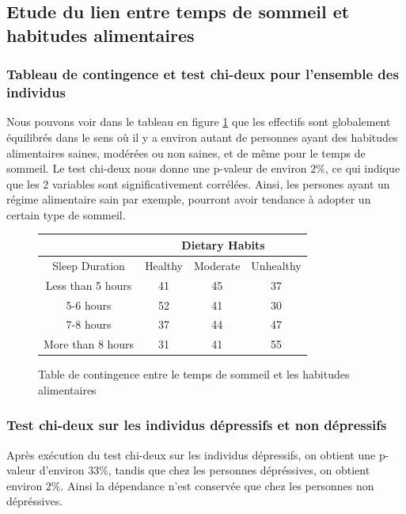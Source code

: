 \subsection{Etude du lien entre temps de sommeil et habitudes alimentaires}

\subsubsection{Tableau de contingence et test chi-deux pour l'ensemble des individus}

Nous pouvons voir dans le tableau en figure \ref{tab:contTableDietarySleepAll} que les effectifs sont globalement équilibrés dans le sens où il y a environ autant de personnes ayant des habitudes alimentaires saines, modérées ou non saines, et de même pour le temps de sommeil. 
Le test chi-deux nous donne une p-valeur de environ $ 2\%$, ce qui indique que les 2 variables sont significativement corrélées. Ainsi, les persones ayant un régime alimentaire sain par exemple, pourront avoir tendance à adopter un certain type de sommeil.

\begin{figure}[!h]
    \begin{center}
      \begin{tabular}{|c|c|c|c|}
        \hline 
        & \multicolumn{3}{|c|}{Dietary Habits}\\ 
        \hline
        Sleep Duration & Healthy & Moderate & Unhealthy\\
        \hline 
        Less than 5 hours & 41 & 45 & 37 \\ 
        \hline 
        5-6 hours & 52 & 41 & 30\\
        \hline 
        7-8 hours & 37 & 44 & 47\\
        \hline 
        More than 8 hours & 31 & 41 & 55\\
        \hline
      \end{tabular}
    \end{center}
    \caption{Table de contingence entre le temps de sommeil et les habitudes alimentaires}
    \label{tab:contTableDietarySleepAll}
\end{figure}  

\subsubsection{Test chi-deux sur les individus dépressifs et non dépressifs}

Après exécution du test chi-deux sur les individus dépressifs, on obtient une p-valeur d'environ $ 33\%$, tandis que chez les personnes dépréssives, on obtient environ $ 2\%$. Ainsi la dépendance n'est conservée que chez les personnes non dépréssives. 

